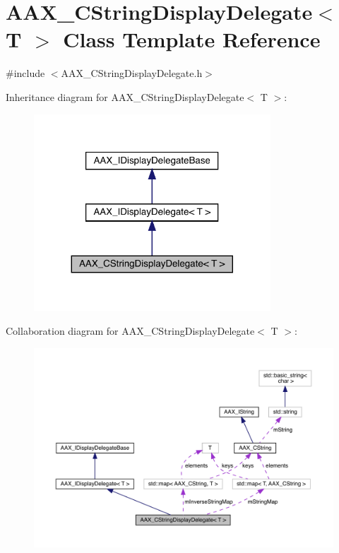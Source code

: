 \hypertarget{a01581}{}\section{A\+A\+X\+\_\+\+C\+String\+Display\+Delegate$<$ T $>$ Class Template Reference}
\label{a01581}


{\ttfamily \#include $<$A\+A\+X\+\_\+\+C\+String\+Display\+Delegate.\+h$>$}



Inheritance diagram for A\+A\+X\+\_\+\+C\+String\+Display\+Delegate$<$ T $>$\+:
\nopagebreak
\begin{figure}[H]
\begin{center}
\leavevmode
\includegraphics[width=251pt]{a01580}
\end{center}
\end{figure}


Collaboration diagram for A\+A\+X\+\_\+\+C\+String\+Display\+Delegate$<$ T $>$\+:
\nopagebreak
\begin{figure}[H]
\begin{center}
\leavevmode
\includegraphics[width=350pt]{a01579}
\end{center}
\end{figure}


